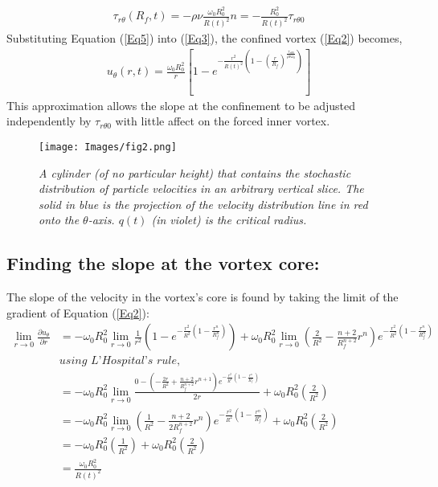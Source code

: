 \documentclass{article}
\begin{document}
\begin{align*}
    \tau_{r\theta}(R_f,t)= -\rho \nu \frac{\omega_0 R_0^2}{R(t)^2}n = -\frac{R_0^2}{R(t)^2}\tau_{r \theta 0}
\end{align*}
Substituting Equation (\ref{Eq5}) into (\ref{Eq3}), the confined vortex (\ref{Eq2}) becomes,
\begin{align}\label{Eq6}
    u_\theta (r,t) =\frac{\omega_{0}R_{0}^{2}}{r}\left[ 1-e^{-\frac{r^{2}}{R\left(t\right)^{2}}\left(1-\left(\frac{r}{R_{f}}\right)^{\frac{\tau_{r\theta 0}}{\rho \nu \omega_0}}\right)}\right]
\end{align}
This approximation allows the slope at the confinement to be adjusted independently by $\tau_{r\theta 0}$ with little affect on the forced inner vortex.

\begin{figure}[h]
    \centering
    \texttt{[image: Images/fig2.png]}
    \caption{\textit{A cylinder (of no particular height) that contains the stochastic distribution of particle velocities in an arbitrary vertical slice. The solid in blue is the projection of the velocity distribution line in red onto the $\theta$-axis. $q(t)$ (in violet) is the critical radius.}}
    \label{fig:enter-label}
\end{figure}

\subsection{Finding the slope at the vortex core:}
The slope of the velocity in the vortex's core is found by taking the limit of the gradient of Equation (\ref{Eq2}):
\begin{align*}
 \displaystyle \lim_{r \to 0} \frac{\partial u_\theta}{\partial r} &= -\omega_0 R_0^{2} \displaystyle \lim_{r \to 0} \frac{1}{r^2}\left ( 1-e^{-\frac{r^2}{R^2}\left ( 1-\frac{r^n}{R_f^n} \right)} \right )+ \omega_0 R_0^2 \displaystyle \lim_{r \to 0} \left ( \frac{2}{R^2}-\frac{n+2}{R_f^{n+2}}r^n \right )e^{-\frac{r^2}{R^2}\left ( 1-\frac{r^n}{R_f^n} \right)} \\
 & \textit{using L'Hospital's rule,} \\
 &= -\omega_0 R_0^2 \displaystyle \lim_{r \to 0} \frac{0-\left ( -\frac{2r}{R^2}+\frac{n+2}{R_f^{n+2}} r^{n+1}\right ) e^{-\frac{r^2}{R^2}\left ( 1-\frac{r^n}{R_f^n} \right)}}{2r} + \omega_0 R_0^2 \left ( \frac{2}{R^2} \right ) \\
 &= -\omega_0 R_0^2 \displaystyle \lim_{r \to 0}\left ( \frac{1}{R^2}-\frac{n+2}{2R_f^{n+2}}r^n \right ) e^{-\frac{r^2}{R^2}\left ( 1-\frac{r^n}{R_f^n} \right)} + \omega_0 R_0^2 \left ( \frac{2}{R^2} \right ) \\
 &= -\omega_0 R_0^2 \left ( \frac{1}{R^2} \right ) + \omega_0 R_0^2 \left ( \frac{2}{R^2} \right ) \\
 &= \frac{\omega_0 R_0^2}{R(t)^2}
\end{align*}
\end{document}
